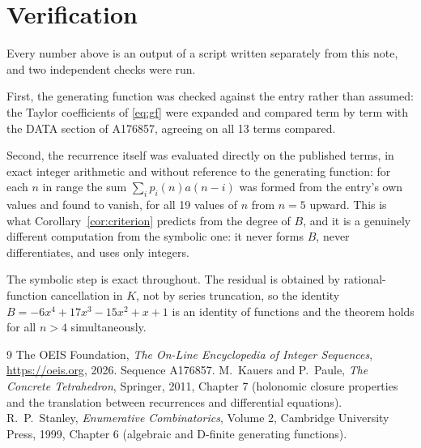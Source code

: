 \documentclass[11pt,a4paper]{article}
\theoremstyle{plain}
\theoremstyle{definition}
\begin{document}
\section{Verification}

Every number above is an output of a script written separately from this note, and two
independent checks were run.

First, the generating function was checked against the entry rather than assumed: the
Taylor coefficients of \eqref{eq:gf} were expanded and compared term by term with the DATA
section of A176857, agreeing on all 13 terms compared.

Second, the recurrence itself was evaluated directly on the published terms, in exact
integer arithmetic and without reference to the generating function: for each $n$ in range
the sum $\sum_{i}p_{i}(n)a(n-i)$ was formed from the entry's own values and found to
vanish, for all 19 values of $n$ from $n=5$ upward. This is what
Corollary~\ref{cor:criterion} predicts from the degree of $B$, and it is a genuinely
different computation from the symbolic one: it never forms $B$, never differentiates, and
uses only integers.

The symbolic step is exact throughout. The residual is obtained by rational-function
cancellation in $K$, not by series truncation, so the identity $B=- 6 x^{4} + 17 x^{3} - 15 x^{2} + x + 1$ is an
identity of functions and the theorem holds for all $n>4$ simultaneously.

\begin{thebibliography}{9}
 The OEIS Foundation, \emph{The On-Line Encyclopedia of Integer Sequences},
\url{https://oeis.org}, 2026. Sequence A176857.
 M.~Kauers and P.~Paule, \emph{The Concrete Tetrahedron}, Springer, 2011,
Chapter 7 (holonomic closure properties and the translation between recurrences and
differential equations).
 R.~P.~Stanley, \emph{Enumerative Combinatorics}, Volume 2, Cambridge
University Press, 1999, Chapter 6 (algebraic and D-finite generating functions).
\end{thebibliography}
\end{document}
